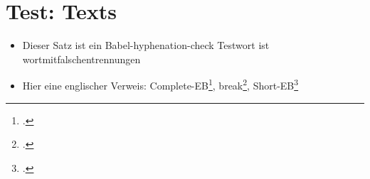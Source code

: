 \documentclass[
  DIV=calc,i
  BCOR=5mm,
  11pt,
  headings=small,
  oneside,
  abstract=true,
  toc=bib,
  english,ngerman]{scrartcl}
\begin{document}
\section{Test: Texts}

\begin{itemize}
  \item Dieser Satz ist ein Babel-hyphenation-check Testwort ist wortmitfalschentrennungen
  \item Hier eine englischer Verweis: Complete-EB\footcite[vgl.][15]{L12020a}, break\footcite[vgl.][15]{BR2020a}, Short-EB\footcite[vgl.][15]{L12020a}
\end{itemize}



\printnomenclature
\printbibliography
\end{document}
